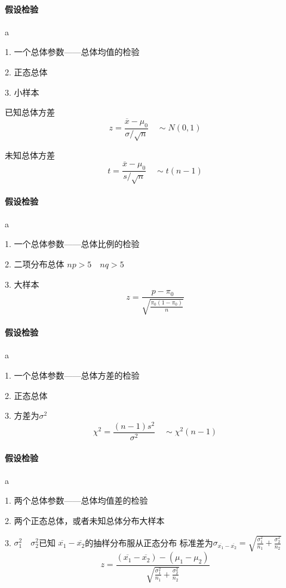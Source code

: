 \documentclass[UTF8,10pt]{book}
\begin{document}
        \paragraph{假设检验} a
        
        1. 一个总体参数——总体均值的检验 
        
        2. 正态总体 
        
        3. 小样本	
        
        已知总体方差 $$ z = \frac{\overline{x}-\mu_0}{\sigma / \sqrt{n}} \quad \sim N(0,1)$$ 
        
        未知总体方差 $$ t = \frac{\overline{x}-\mu_0}{s / \sqrt{n}} \quad \sim t(n-1) $$
        
        \paragraph{假设检验} a
        
        1. 一个总体参数——总体比例的检验 
        
        2. 二项分布总体 $np>5 \quad nq>5$ 
        
        3. 大样本	
        $$ z = \frac{p-\pi_0}{ \sqrt{\frac{\pi_0(1-\pi_0)}{n}} } $$
        
        \paragraph{假设检验} a
        
        1. 一个总体参数——总体方差的检验 
        
        2. 正态总体 
        
        3. 方差为$\sigma^2$	
        $$ \chi^2 = \frac{(n-1)s^2}{\sigma^2} \quad \sim \chi^2(n-1) $$
        
        \paragraph{假设检验}   a
        
        1. 两个总体参数——总体均值差的检验 
        
        2. 两个正态总体，或者未知总体分布大样本 
        
        3. $\sigma_1^2 \quad \sigma_2^2$已知	
        $\overline{x_1} - \overline{x_2}$的抽样分布服从正态分布 
        标准差为$ \sigma_{\overline{x_1} - \overline{x_2}} =\sqrt{\frac{\sigma_1^2}{n_1}+\frac{\sigma_2^2}{n_2}} $ 
        $$ z = \frac{(\overline{x_1} - \overline{x_2} )- (\mu_1-\mu_2)}{\sqrt{\frac{\sigma_1^2}{n_1}+\frac{\sigma_2^2}{n_2}} } $$
        
\end{document}
